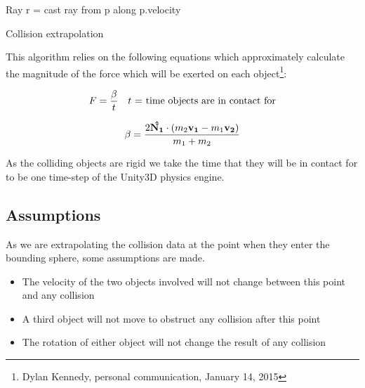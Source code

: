 \begin{algorithm}[H]
 Ray r = cast ray from p along p.velocity\;
 \caption{Collision extrapolation}
 \label{alg:extrap}
\end{algorithm}

This algorithm relies on the following equations which approximately calculate the magnitude of the force which will be exerted on each object\footnote{Dylan Kennedy, personal communication, January 14, 2015}:

\begin{equation}
F = {\beta \over t} \quad \text{$t$ = time objects are in contact for}
\end{equation}

\begin{equation}
\beta = {2\mathbf{\hat{N_1}}\cdot (m_{2}\mathbf{v_1}-m_{1}\mathbf{v_2}) \over m_{1}+m_{2}}
\end{equation}

As the colliding objects are rigid we take the time that they will be in contact for to be one time-step of the Unity3D physics engine.

\subsection{Assumptions}

As we are extrapolating the collision data at the point when they enter the bounding sphere, some assumptions are made.

\begin{itemize}
\item{The velocity of the two objects involved will not change between this point and any collision}
\item{A third object will not move to obstruct any collision after this point}
\item{The rotation of either object will not change the result of any collision}
\end{itemize}

